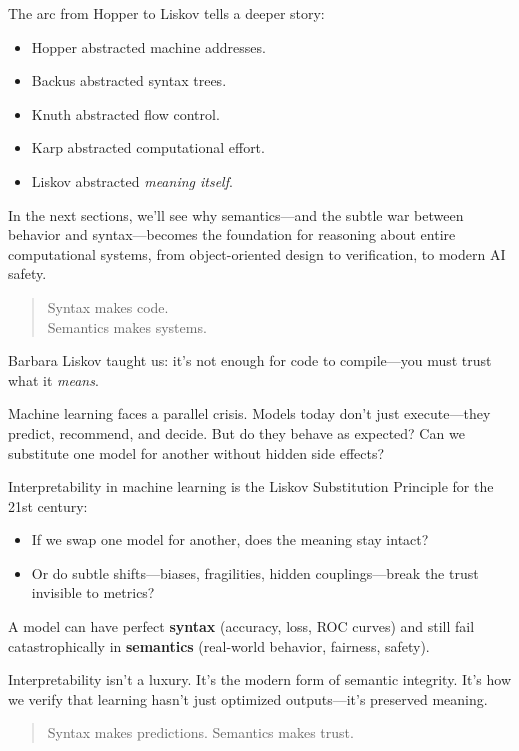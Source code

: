 The arc from Hopper to Liskov tells a deeper story:

\begin{itemize}
  \item Hopper abstracted machine addresses.
  \item Backus abstracted syntax trees.
  \item Knuth abstracted flow control.
  \item Karp abstracted computational effort.
  \item Liskov abstracted \textit{meaning itself}.
\end{itemize}

In the next sections, we’ll see why semantics—and the subtle war between behavior and syntax—becomes the foundation for reasoning about entire computational systems, from object-oriented design to verification, to modern AI safety.

\begin{quote}
Syntax makes code.\\
Semantics makes systems.
\end{quote}

\begin{tcolorbox}[colback=gray!5!white, colframe=black, title=\textbf{Sidebar: Meaning, Models, and the Hidden Cost of Black Boxes},fonttitle=\bfseries]

    Barbara Liskov taught us: it’s not enough for code to compile—you must trust what it \emph{means}.
    \medskip
    
    Machine learning faces a parallel crisis. Models today don’t just execute—they predict, recommend, and decide. But do they behave as expected? Can we substitute one model for another without hidden side effects?
    \medskip
    
    Interpretability in machine learning is the Liskov Substitution Principle for the 21st century:
    \medskip
    
    \begin{itemize}
    \item If we swap one model for another, does the meaning stay intact?
    \item Or do subtle shifts—biases, fragilities, hidden couplings—break the trust invisible to metrics?
    \end{itemize}

    \medskip
    
    A model can have perfect \textbf{syntax} (accuracy, loss, ROC curves) and still fail catastrophically in \textbf{semantics} (real-world behavior, fairness, safety).
    
    \medskip
    
    Interpretability isn’t a luxury. It’s the modern form of semantic integrity.  
    It's how we verify that learning hasn’t just optimized outputs—it’s preserved meaning.
    
    \begin{quote}
    Syntax makes predictions. Semantics makes trust.
    \end{quote}
    
\end{tcolorbox}

